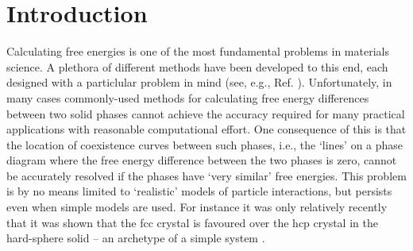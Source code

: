 \documentclass{report}
\begin{document}
\chapter{Introduction}
Calculating free energies is one of the most fundamental problems in materials science.
A plethora of different methods have been developed to this end, each designed with a particlular problem in mind (see, e.g., Ref. \cite{book:Frenkel}).
Unfortunately, in many cases commonly-used methods for calculating free energy differences between two solid phases cannot
achieve the accuracy required for many practical applications with reasonable computational effort.
One consequence of this is that the location of coexistence curves between such phases, i.e., the `lines' on a phase diagram
where the free energy difference between the two phases is zero, cannot be accurately resolved if the phases
have `very similar' free energies. This problem is by no means limited to `realistic' models of particle interactions, but
persists even when simple models are used. For instance it was only relatively recently that it was shown that the fcc crystal is
favoured over the hcp crystal in the hard-sphere solid -- an archetype of a simple system \cite{Bruce_1997,Bruce_2000,Jackson_2002}.
\end{document}
